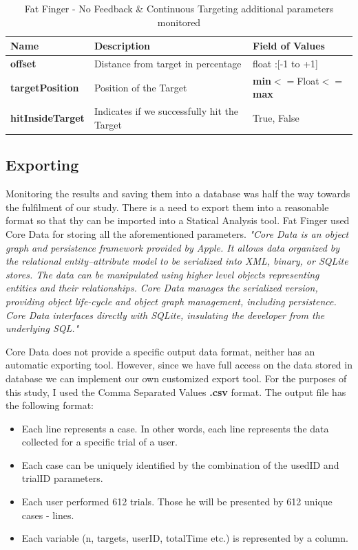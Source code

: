\begin{table}[H]
\centering
\begin{tabular}{l || l || l}
Name & Description & Field of Values \\
\hline \hline
\textbf{offset} & Distance from target in percentage & float :[-1 to +1] \\
\textbf{targetPosition} & Position of the Target & \textbf{min}$<=$Float$<=$\textbf{max} \\
\textbf{hitInsideTarget} & Indicates if we successfully hit the Target & True, False
\end{tabular}
\caption{Fat Finger - No Feedback \& Continuous Targeting additional parameters monitored}
\label{tab:ffNFNDData}
\end{table}

\subsection{Exporting}
\label{sec:exporting}

Monitoring the results and saving them into a database was half the way towards the fulfilment of our study. There is a need to export them into a reasonable format so that thy can be imported into a Statical Analysis tool. Fat Finger used Core Data for storing all the aforementioned parameters.
\emph{"Core Data is an object graph and persistence framework provided by Apple. It allows data organized by the relational entity–attribute model to be serialized into XML, binary, or SQLite stores. The data can be manipulated using higher level objects representing entities and their relationships. Core Data manages the serialized version, providing object life-cycle and object graph management, including persistence. Core Data interfaces directly with SQLite, insulating the developer from the underlying SQL."} \cite{coreData}

Core Data does not provide a specific output data format, neither has an automatic exporting tool. However, since we have full access on the data stored in database we can implement our own customized export tool. For the purposes of this study, I used the Comma Separated Values \textbf{.csv} format. The output file has the following format:

\begin{itemize}
	\item Each line represents a case. In other words, each line represents the data collected for a specific trial of a user.
	\item Each case can be uniquely identified by the combination of the usedID and trialID parameters.
	\item Each user performed 612 trials. Those he will be presented by 612 unique cases - lines.
	\item Each variable (n, targets, userID, totalTime etc.) is represented by a column.
\end{itemize}




